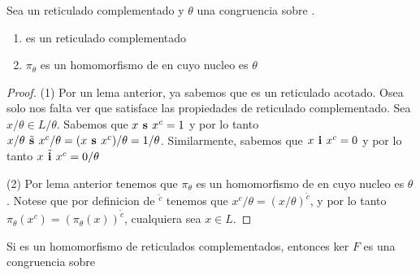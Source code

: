   \begin{lemma}
    Sea \reticulCompl un reticulado complementado y $\theta$ una congruencia sobre \reticulCompl.
    \begin{enumerate}
      \item {} es un reticulado complementado
      \item $\pi_\theta$ es un homomorfismo de \reticulCompl en  cuyo nucleo es $\theta$
    \end{enumerate}
  \end{lemma}
  \begin{proof}
    (1) Por un lema anterior, ya sabemos que  es un reticulado acotado.
    Osea solo nos falta ver que  satisface las propiedades de reticulado complementado.
    Sea $x/\theta \in L/\theta$. Sabemos que $x\textbf{ s }x^c = 1$ y por lo tanto $x/\theta\tilde{\textbf{ s }}x^c/\theta = (x\textbf{ s }x^c)/\theta = 1/\theta$.
    Similarmente, sabemos que $x\textbf{ i }x^c = 0$ y por lo tanto $x\tilde{\textbf{ i }}x^c = 0/\theta$

    (2) Por lema anterior tenemos que $\pi_\theta$ es un homomorfismo de \reticulAcot en  cuyo nucleo es $\theta$.
    Notese que por definicion de ${}^{\tilde{c}}$ tenemos que $x^c/\theta = (x/\theta)^{\tilde{c}}$, y por lo tanto $\pi_\theta(x^c) = (\pi_\theta(x))^{\tilde{c}}$,
    cualquiera sea $x \in L$.

  \end{proof}

  \begin{lemma}
    Si  es un homomorfismo de
    reticulados complementados, entonces ker $F$ es una congruencia sobre \reticulCompl
  \end{lemma}
  \noproof